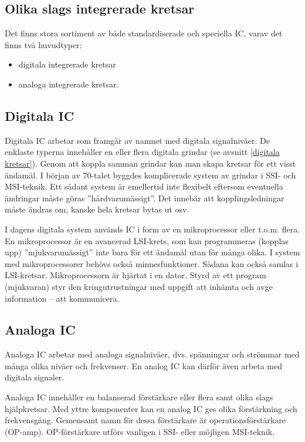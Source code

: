 \subsection{Olika slags integrerade kretsar}

Det finns stora sortiment av både standardiserade och speciella IC, varav det
finns två huvudtyper:
\begin{itemize}
  \item digitala integrerade kretsar
  \item analoga integrerade kretsar.
\end{itemize}

\subsection{Digitala IC}

Digitala IC arbetar som framgår av namnet med digitala signalnivåer. De enklaste
typerna innehåller en eller flera digitala grindar (se avsnitt
\ref{digitala kretsar}).
Genom att koppla samman grindar kan man skapa kretsar för ett visst ändamål.
I början av 70-talet byggdes komplicerade system av grindar i SSI- och
MSI-teknik.
Ett sådant system är emellertid inte flexibelt eftersom eventuella ändringar
måste göras ''hårdvarumässigt''.
Det innebär att kopplingsledningar måste ändras om, kanske hela kretsar bytas
ut osv.

I dagens digitala system används IC i form av en mikroprocessor eller t.o.m.
flera. En mikroprocessor är en avancerad LSI-krets, som kan programmeras
(kopplas upp) ''mjukvarumässigt'' inte bara för ett ändamål utan för många
olika. I system med mikroprocessorer behövs också minnesfunktioner. Sådana kan
också samlas i LSI-kretsar. Mikroprocessorn är hjärtat i en dator. Styrd av ett
program (mjukvaran) styr den kringutrustningar med uppgift att inhämta och avge
information -- att kommunicera.

\subsection{Analoga IC}

Analoga IC arbetar med analoga signalnivåer, dvs. spänningar och strömmar med
många olika nivåer och frekvenser. En analog IC kan därför även arbeta med
digitala signaler.

Analoga IC innehåller en balanserad förstärkare eller flera samt olika slags
hjälpkretsar. Med yttre komponenter kan en analog IC ges olika förstärkning och
frekvensgång. Gemensamt namn för dessa förstärkare är operationsförstärkare
(OP-amp). OP-förstärkare utförs vanligen i SSI- eller möjligen MSI-teknik.

